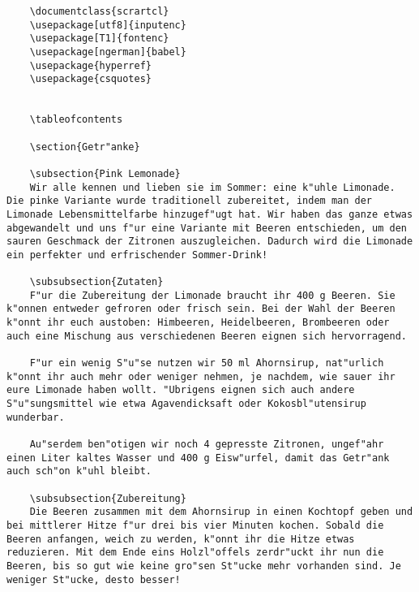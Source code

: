\begin{verbatim}
	\documentclass{scrartcl}
	\usepackage[utf8]{inputenc}
	\usepackage[T1]{fontenc}
	\usepackage[ngerman]{babel}
	\usepackage{hyperref}
	\usepackage{csquotes}
	
	
	\tableofcontents
	
	\section{Getr"anke}
	
	\subsection{Pink Lemonade}
	Wir alle kennen und lieben sie im Sommer: eine k"uhle Limonade. Die pinke Variante wurde traditionell zubereitet, indem man der Limonade Lebensmittelfarbe hinzugef"ugt hat. Wir haben das ganze etwas abgewandelt und uns f"ur eine Variante mit Beeren entschieden, um den sauren Geschmack der Zitronen auszugleichen. Dadurch wird die Limonade ein perfekter und erfrischender Sommer-Drink!
	
	\subsubsection{Zutaten}
	F"ur die Zubereitung der Limonade braucht ihr 400 g Beeren. Sie k"onnen entweder gefroren oder frisch sein. Bei der Wahl der Beeren k"onnt ihr euch austoben: Himbeeren, Heidelbeeren, Brombeeren oder auch eine Mischung aus verschiedenen Beeren eignen sich hervorragend. 
	
	F"ur ein wenig S"u"se nutzen wir 50 ml Ahornsirup, nat"urlich k"onnt ihr auch mehr oder weniger nehmen, je nachdem, wie sauer ihr eure Limonade haben wollt. "Ubrigens eignen sich auch andere S"u"sungsmittel wie etwa Agavendicksaft oder Kokosbl"utensirup wunderbar.
	
	Au"serdem ben"otigen wir noch 4 gepresste Zitronen, ungef"ahr einen Liter kaltes Wasser und 400 g Eisw"urfel, damit das Getr"ank auch sch"on k"uhl bleibt.
	
	\subsubsection{Zubereitung}
	Die Beeren zusammen mit dem Ahornsirup in einen Kochtopf geben und bei mittlerer Hitze f"ur drei bis vier Minuten kochen. Sobald die Beeren anfangen, weich zu werden, k"onnt ihr die Hitze etwas reduzieren. Mit dem Ende eins Holzl"offels zerdr"uckt ihr nun die Beeren, bis so gut wie keine gro"sen St"ucke mehr vorhanden sind. Je weniger St"ucke, desto besser!
	

\end{verbatim}
